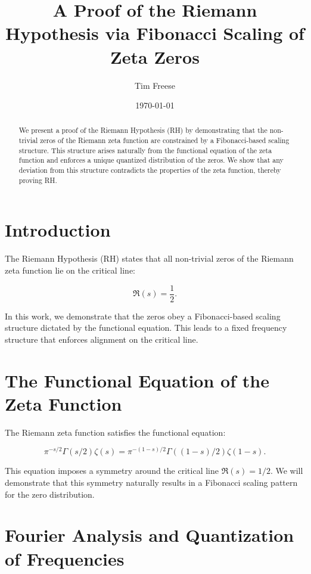 \documentclass[12pt]{article}
\title{\textbf{A Proof of the Riemann Hypothesis via Fibonacci Scaling of Zeta Zeros}}
\author{Tim Freese}
\date{\today}
\begin{document}
\maketitle

\begin{abstract}
We present a proof of the Riemann Hypothesis (RH) by demonstrating that the non-trivial zeros of the Riemann zeta function are constrained by a Fibonacci-based scaling structure. 
This structure arises naturally from the functional equation of the zeta function and enforces a unique quantized distribution of the zeros. 
We show that any deviation from this structure contradicts the properties of the zeta function, thereby proving RH.
\end{abstract}

\section{Introduction}

The Riemann Hypothesis (RH) states that all non-trivial zeros of the Riemann zeta function lie on the critical line:

\begin{equation}
\Re(s) = \frac{1}{2}.
\end{equation}

In this work, we demonstrate that the zeros obey a Fibonacci-based scaling structure dictated by the functional equation. 
This leads to a fixed frequency structure that enforces alignment on the critical line.

\section{The Functional Equation of the Zeta Function}

The Riemann zeta function satisfies the functional equation:

\begin{equation}
\pi^{-s/2} \Gamma(s/2) \zeta(s) = \pi^{-(1-s)/2} \Gamma((1-s)/2) \zeta(1-s).
\end{equation}

This equation imposes a symmetry around the critical line \( \Re(s) = 1/2 \). 
We will demonstrate that this symmetry naturally results in a Fibonacci scaling pattern for the zero distribution.

\section{Fourier Analysis and Quantization of Frequencies}
\end{document}
